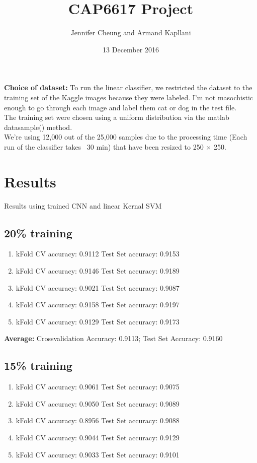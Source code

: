 \documentclass{article}
\title{CAP6617 Project}
\date{13 December 2016}
\author{Jennifer Cheung and Armand Kapllani}
\begin{document}
	\maketitle
	\textbf{Choice of dataset:}  To run the linear classifier, we restricted the dataset to the training set of the Kaggle images because they were labeled. I'm not masochistic enough to go through each image and label them cat or dog in the test file. \\
	The training set were chosen using a uniform distribution via the matlab datasample() method. \\  
	We're using 12,000 out of the 25,000 samples due to the processing time (Each run of the classifier takes ~30 min) that have been resized to 250 $\times$ 250.

	\section{Results}
	Results using trained CNN and linear Kernal SVM
	\subsection{20\% training}
	\begin{enumerate}
		\item kFold CV accuracy: 0.9112  \indent Test Set accuracy: 0.9153
		\item kFold CV accuracy: 0.9146  \indent Test Set accuracy: 0.9189
		\item kFold CV accuracy: 0.9021  \indent Test Set accuracy: 0.9087
		\item kFold CV accuracy: 0.9158  \indent Test Set accuracy: 0.9197
		\item kFold CV accuracy: 0.9129  \indent Test Set accuracy: 0.9173
	\end{enumerate}

	\textbf{Average:} Crossvalidation Accuracy: 0.9113;  Test Set Accuracy: 0.9160

	\subsection{15\% training}
	\begin{enumerate}
		\item kFold CV accuracy: 0.9061  \indent Test Set accuracy: 0.9075
		\item kFold CV accuracy: 0.9050  \indent Test Set accuracy: 0.9089
		\item kFold CV accuracy: 0.8956  \indent Test Set accuracy: 0.9088
		\item kFold CV accuracy: 0.9044  \indent Test Set accuracy: 0.9129
		\item kFold CV accuracy: 0.9033  \indent Test Set accuracy: 0.9101
	\end{enumerate}
\end{document}

